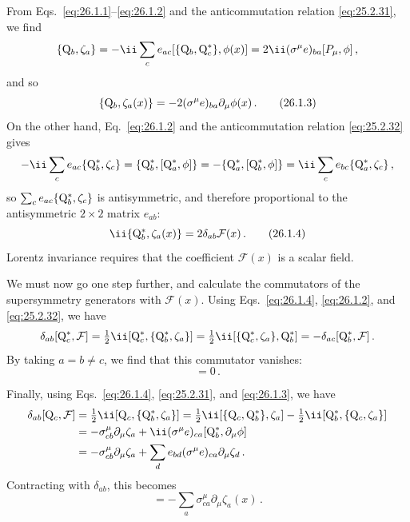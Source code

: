 From Eqs.~\eqref{eq:26.1.1}--\eqref{eq:26.1.2} and the anticommutation
relation \eqref{eq:25.2.31}, we find
\[
  \{\WeylQ_b,\zeta_a\}
  =-\ii\sum_c e_{ac}[\{\WeylQ_b,\WeylQ_c^*\},\phi(x)]
  =2\ii(\sigma^\mu e)_{ba}[P_\mu,\phi]\,,
\]
and so
\begin{equation}
  \{\mathrm{Q}_b,\zeta_a(x)\}
  =-2(\sigma^\mu e)_{ba}\partial_\mu\phi(x)\,.
  \tag{26.1.3}\label{eq:26.1.3}
\end{equation}
On the other hand, Eq.~\eqref{eq:26.1.2} and the anticommutation relation
\eqref{eq:25.2.32} gives
\[
  -\ii\sum_c e_{ac}\{\WeylQ_b^*,\zeta_c\}
  =\{\WeylQ_b^*,[\WeylQ_a^*,\phi]\}
  =-\{\WeylQ_a^*,[\WeylQ_b^*,\phi]\}
  =\ii\sum_c e_{bc}\{\WeylQ_a^*,\zeta_c\}\,,
\]
so \(\sum_c e_{ac}\{\mathrm{Q}_b^*,\zeta_c\}\) is antisymmetric, and therefore
proportional to the antisymmetric \(2\times2\) matrix \(e_{ab}\):
\begin{equation}
  \ii\{\WeylQ_b^*,\zeta_a(x)\}=2\delta_{ab}\mathcal{F}(x)\,.
  \tag{26.1.4}\label{eq:26.1.4}
\end{equation}
Lorentz invariance requires that the coefficient \(\mathcal{F}(x)\) is a
scalar field.

We must now go one step further, and calculate the commutators of the
supersymmetry generators with \(\mathcal{F}(x)\). Using
Eqs.~\eqref{eq:26.1.4}, \eqref{eq:26.1.2}, and \eqref{eq:25.2.32}, we have
\[
  \delta_{ab}[\WeylQ_c^*,\mathcal{F}]
  =\tfrac12 \ii[\WeylQ_c^*,\{\WeylQ_b^*,\zeta_a\}]
  =\tfrac12 \ii[\{\WeylQ_c^*,\zeta_a\},\WeylQ_b^*]
  =-\delta_{ac}[\WeylQ_b^*,\mathcal{F}]\,.
\]
By taking \(a=b\ne c\), we find that this commutator vanishes:
\begin{equation}
  [\WeylQ_c^*,\mathcal{F}(x)]=0\,.
  \tag{26.1.5}\label{eq:26.1.5}
\end{equation}

Finally, using Eqs.~\eqref{eq:26.1.4}, \eqref{eq:25.2.31}, and
\eqref{eq:26.1.3}, we have
\[
  \begin{aligned}
  \delta_{ab}[\WeylQ_c,\mathcal{F}]
  &=\tfrac12 \ii[\WeylQ_c,\{\WeylQ_b^*,\zeta_a\}]
    =\tfrac12 \ii[\{\WeylQ_c,\WeylQ_b^*\},\zeta_a]
      -\tfrac12 \ii[\WeylQ_b^*,\{\WeylQ_c,\zeta_a\}]
  \\
  &=-\sigma^\mu_{cb}\partial_\mu\zeta_a
    +\ii(\sigma^\mu e)_{ca}[\WeylQ_b^*,\partial_\mu\phi]
  \\
  &=-\sigma^\mu_{cb}\partial_\mu\zeta_a
    +\sum_d e_{bd}(\sigma^\mu e)_{ca}\partial_\mu\zeta_d\,.
  \end{aligned}
\]
Contracting with \(\delta_{ab}\), this becomes
\begin{equation}
  [\WeylQ_c,\mathcal{F}(x)]
  =-\sum_a\sigma^\mu_{ca}\partial_\mu\zeta_a(x)\,.
  \tag{26.1.6}\label{eq:26.1.6}
\end{equation}

